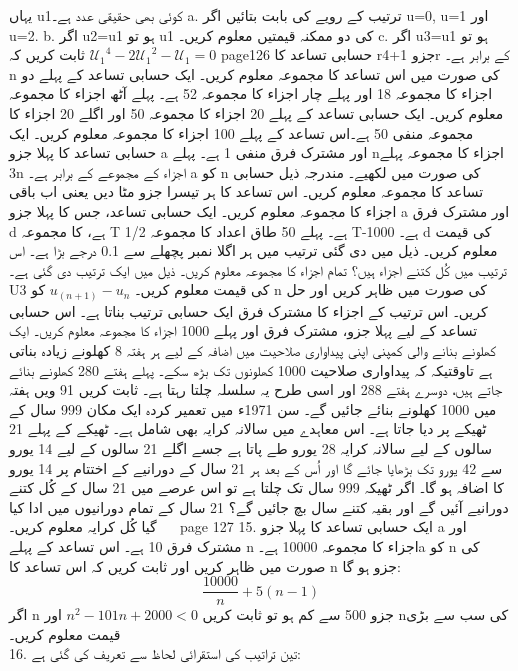 یہاں  u1کوئی بھی حقیقی عدد ہے۔
a.	ترتیب کے رویے کی بابت بتائیں اگر u=0, u=1 اور u=2.
b.	اگر u2=u1 ہو تو u1 کی دو ممکنہ قیمتیں معلوم کریں۔
c.	اگر u3=u1 ہو تو ثابت کریں کہ
\({\mathcal{U}_1}^4-2{\mathcal{U}_1}^2-\mathcal{U}_1=0\)
\clearpage
page126
	حسابی تساعد کا rجزو 1+4r کے برابر ہے۔ n کی صورت میں اس تساعد کا مجموعہ معلوم کریں۔
	ایک حسابی تساعد کے پہلے دو اجزاء کا مجموعہ 18 اور پہلے چار اجزاء کا مجموعہ 52 ہے۔ پہلے آٹھ اجزاء کا مجموعہ معلوم کریں۔
	ایک حسابی تساعد کے پہلے 20 اجزاء کا مجموعہ 50 اور اگلے 20 اجزاء کا مجموعہ منفی 50 ہے۔اس تساعد کے پہلے 100 اجزاء کا مجموعہ معلوم کریں۔
	ایک حسابی تساعد کا پہلا جزو a اور مشترک فرق منفی 1 ہے۔ پہلے nاجزاء کا مجموعہ پہلے 3n اجزاء کے مجموعے کے برابر ہے۔ a کو n کی صورت میں لکھیے۔
	مندرجہ ذیل حسابی تساعد کا مجموعہ معلوم کریں۔
اس تساعد کا ہر تیسرا جزو مٹا دیں یعنی
اب باقی اجزاء کا مجموعہ معلوم کریں۔
	ایک حسابی تساعد، جس کا پہلا جزو a اور مشترک فرق d ہے، کا مجموعہ T ہے۔ پہلے 50 طاق اعداد کا مجموعہ 1/2 T-1000 ہے۔ d کی قیمت معلوم کریں۔
	ذیل میں دی گئی ترتیب میں ہر اگلا نمبر پچھلے سے 0.1 درجے بڑا ہے۔
	اس ترتیب میں کُل کتنے اجزاء ہیں؟
	تمام اجزاء کا مجموعہ معلوم کریں۔
	ذیل میں ایک ترتیب دی گئی ہے۔
	U3 کی قیمت معلوم کریں۔
	\(  u_{(n+1)}-u_{n}\)
	   کو n کی صورت میں ظاہر کریں اور حل کریں۔
	اس ترتیب کے اجزاء کا مشترک فرق ایک حسابی ترتیب بناتا ہے۔ اس حسابی تساعد کے لیے پہلا جزو، مشترک فرق اور پہلے 1000 اجزاء کا مجموعہ معلوم کریں۔
	ایک کھلونے بنانے والی کمپنی اپنی پیداواری صلاحیت میں اضافہ کے لیے ہر ہفتہ 8 کھلونے زیادہ بناتی ہے تاوقتیکہ کہ پیداواری صلاحیت 1000 کھلونوں تک بڑھ سکے۔  پہلے ہفتے 280 کھلونے بنائے جاتے ہیں، دوسرے ہفتے 288 اور اسی طرح یہ سلسلہ چلتا رہتا ہے۔ ثابت کریں 91 ویں ہفتہ میں 1000 کھلونے بنائے جائیں گے۔
	سن 1971ء میں تعمیر کردہ ایک مکان 999 سال کے ٹھیکے پر دیا جاتا ہے۔ اس معاہدے میں سالانہ کرایہ بھی شامل ہے۔ ٹھیکے کے پہلے 21 سالوں کے لیے سالانہ کرایہ 28 یورو طے پاتا ہے جسے اگلے 21 سالوں کے لیے 14 یورو سے 42 یورو تک بڑھایا جائے گا اور اُس کے بعد ہر 21 سال کے دورانیے کے اختتام پر 14 یورو کا اضافہ ہو گا۔
	اگر ٹھیکہ 999 سال تک چلتا ہے تو اس عرصے میں 21 سال کے کُل کتنے دورانیے آئیں گے اور بقیہ کتنے سال بچ جائیں گے؟
	21 سال کے تمام دورانیوں میں ادا کیا گیا کُل کرایہ معلوم کریں۔
 
\clearpage
page 127
15.	ایک حسابی تساعد کا پہلا جزو a اور مشترک فرق 10 ہے۔ اس تساعد کے پہلے n اجزاء کا مجموعہ 10000 ہے۔a کو n کی صورت میں ظاہر کریں اور ثابت کریں کہ اس تساعد کا n جزو ہو گا:
\[\frac{10000}{n}+5(n-1)\]
اگر n جزو 500 سے کم ہو تو ثابت کریں
\(n^{2}-101n+2000<0\)
	 اور nکی سب سے بڑی قیمت معلوم کریں۔\\
16.	تین تراتیب کی استقرائی لحاظ سے تعریف کی گئی ہے:\\
